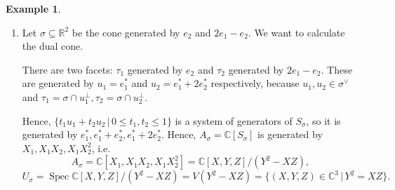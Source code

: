 \documentclass[12pt]{article}
\theoremstyle{definition}
\newtheorem*{example}{Example}
\DeclareMathOperator{\Spec}{Spec}
\begin{document}
\begin{example}
\begin{enumerate}[label=\arabic*)]
\item Let $\sigma\subseteq\mathbb{R}^2$ be the cone generated by $e_2$ and $2e_1-e_2$. We want to calculate the dual cone.

There are two facets: $\tau_1$ generated by $e_2$ and $\tau_2$ generated by $2e_1-e_2$. These are generated by $u_1=e_1^*$ and $u_2=e_1^*+2e_2^*$ respectively, because $u_1,u_2\in\sigma^{\vee}$ and $\tau_1=\sigma\cap u_1^{\perp},\tau_2=\sigma\cap u_2^{\perp}$.

Hence, $\{t_1u_1+t_2u_2\,|\,0\leq t_1,t_2\leq1\}$ is a system of generators of $S_{\sigma}$, so it is generated by $e_1^*,e_1^*+e_2^*,e_1^*+2e_2^*$. Hence, $A_{\sigma}=\mathbb{C}[S_{\sigma}]$ is generated by $X_1,X_1X_2,X_1X_2^2$, i.e.
\[A_{\sigma}=\mathbb{C}[X_1,X_1X_2,X_1X_2^2]=\mathbb{C}[X,Y,Z]/(Y^2-XZ),\]
\[U_{\sigma}=\Spec\mathbb{C}[X,Y,Z]/(Y^2-XZ)=V(Y^2-XZ)=\{(X,Y,Z)\in\mathbb{C}^3\,|\,Y^2=XZ\}.\]


\end{enumerate}
\end{example}
\end{document}
